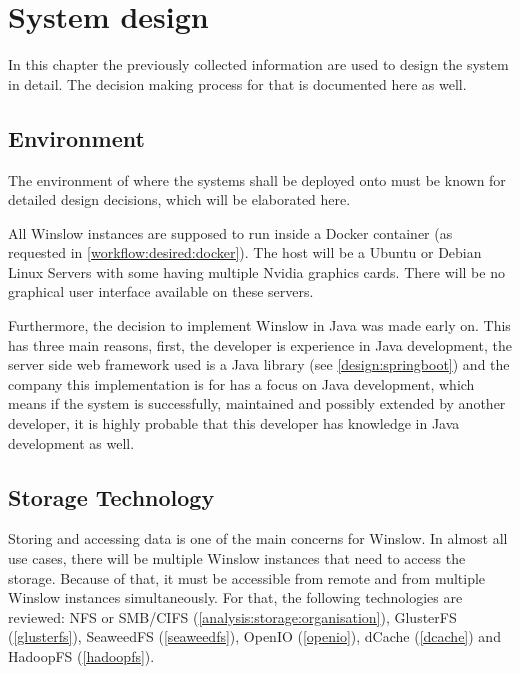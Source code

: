 \chapter{System design}

In this chapter the previously collected information are used to design the system in detail.
The decision making process for that is documented here as well.

\section{Environment}

The environment of where the systems shall be deployed onto must be known for detailed design decisions, which will be elaborated here.

All Winslow instances are supposed to run inside a Docker container (as requested in \autoref{workflow:desired:docker}).
The host will be a Ubuntu or Debian Linux Servers with some having multiple Nvidia graphics cards.
There will be no graphical user interface available on these servers.

Furthermore, the decision to implement Winslow in Java was made early on.
This has three main reasons, first, the developer is experience in Java development, the server side web framework used is a Java library (see \autoref{design:springboot}) and the company this implementation is for has a focus on Java development, which means if the system is successfully, maintained and possibly extended by another developer, it is highly probable that this developer has knowledge in Java development as well.


\section{Storage Technology}

Storing and accessing data is one of the main concerns for Winslow.
In almost all use cases, there will be multiple Winslow instances that need to access the storage.
Because of that, it must be accessible from remote and from multiple Winslow instances simultaneously.
For that, the following technologies are reviewed: NFS or SMB/CIFS (\autoref{analysis:storage:organisation}),  GlusterFS (\autoref{glusterfs}), SeaweedFS (\autoref{seaweedfs}), OpenIO (\autoref{openio}), dCache (\autoref{dcache}) and HadoopFS (\autoref{hadoopfs}).

